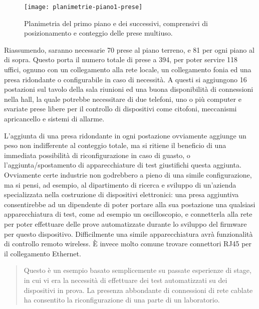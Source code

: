 \begin{figure}[ht]
  \texttt{[image: planimetrie-piano1-prese]}
  \caption{Planimetria del primo piano e dei successivi, comprensivi di posizionamento e conteggio delle prese multiuso.}\label{fig:planimetria-1-prese}
\end{figure}

Riassumendo, saranno necessarie \num{70} prese al piano terreno, e \num{81} per ogni piano al di sopra.
Questo porta il numero totale di prese a 394, per poter servire 118 uffici, ognuno con un collegamento alla rete locale,
un collegamento fonia ed una presa ridondante o configurabile in caso di necessità. A questi si aggiungono 16 postazioni
sul tavolo della sala riunioni ed una buona disponibilità di connessioni nella hall, la quale potrebbe necessitare di due telefoni,
uno o più computer e svariate prese libere per il controllo di dispositivi come citofoni, meccanismi apricancello e sistemi di
allarme.

L'aggiunta di una presa ridondante in ogni postazione ovviamente aggiunge un peso non indifferente al conteggio totale,
ma si ritiene il beneficio di una immediata possibilità di riconfigurazione in caso di guasto, o l'aggiunta/spostamento di apparecchiature
di test giustifichi questa aggiunta. Ovviamente certe industrie non godrebbero a pieno di una simile configurazione, ma si pensi, ad esempio, al
dipartimento di ricerca e sviluppo di un'azienda specializzata nella costruzione di dispositivi elettronici: una presa aggiuntiva consentirebbe
ad un dipendente di poter portare alla sua postazione una qualsiasi apparecchiatura di test, come ad esempio un oscilloscopio,
e connetterla alla rete per poter effettuare delle prove automatizzate durante lo sviluppo del firmware per questo dispositivo.
Difficilmente una simile apparecchiatura avrà funzionalità di controllo remoto wireless. È invece molto comune trovare connettori RJ45 per il collegamento Ethernet.

\begin{quotation}
  \color{gray}
  Questo è un esempio basato semplicemente su passate esperienze di stage, in cui vi era la necessità di effettuare dei test
  automatizzati su dei dispositivi in prova. La presenza abbondante di connessioni di rete cablate ha consentito la riconfigurazione
  di una parte di un laboratorio.
\end{quotation}
